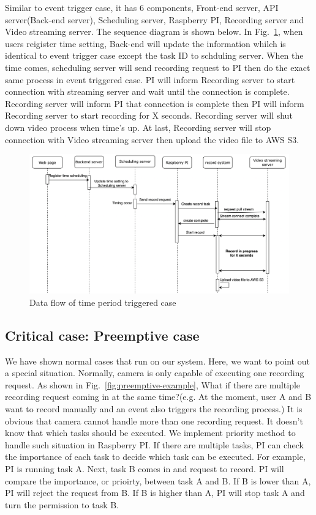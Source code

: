 Similar to event trigger case, it has 6 components, Front-end server, API server(Back-end server), Scheduling server, Raspberry PI, Recording server and Video streaming server. The sequence diagram is shown below. In Fig.~\ref{fig:time-sequence-diagram}, when users reigister time setting, Back-end will update the information whilch is identical to event trigger case except the task ID to schduling server. When the time comes, scheduling server will send recording request to PI then do the exact same process in event triggered case. PI will inform Recording server to start connection with streaming server and wait until the connection is complete. Recording server will inform PI that connection is complete then PI will inform Recording server to start recording for X seconds. Recording server will shut down video process when time's up. At last, Recording server will stop connection with Video streaming server then upload the video file to AWS S3.

\begin{figure}[H]
    \centering
    \includegraphics[width=\textwidth]{figsrc/time-sequence-diagram.png}
    \caption{Data flow of time period triggered case\label{fig:time-sequence-diagram}}
\end{figure}

\subsection{Critical case: Preemptive case}
We have shown normal cases that run on our system. Here, we want to point out a special situation. Normally, camera is only capable of executing one recording request. As shown in Fig.~\ref{fig:preemptive-example}, What if there are multiple recording request coming in at the same time?(e.g. At the moment, user A and B want to record manually and an event also triggers the recording process.) It is obvious that camera cannot handle more than one recording request. It doesn't know that which tasks should be executed. We implement priority method to handle such situation in Raspberry PI. If there are multiple tasks, PI can check the importance of each task to decide which task can be executed. For example, PI is running task A. Next, task B comes in and request to record. PI will compare the importance, or prioirty, between task A and B. If B is lower than A, PI will reject the request from B. If B is higher than A, PI will stop task A and turn the permission to task B.


